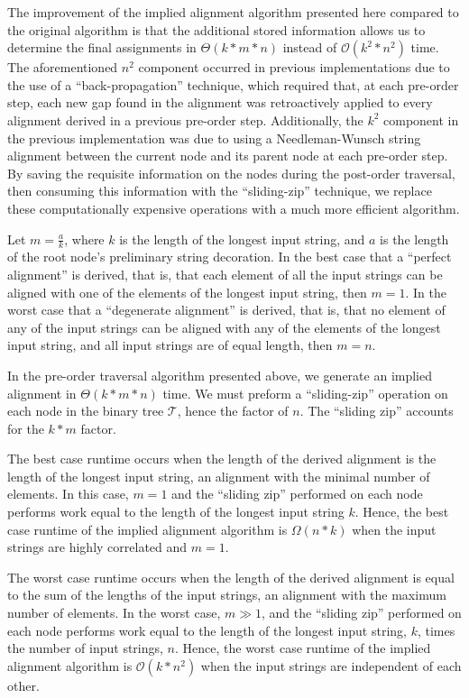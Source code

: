 \documentclass{bmcart}
\begin{document}
The improvement of the implied alignment algorithm presented here compared to the original algorithm is that the additional stored information allows us to determine the final assignments in $\Theta(k * m * n)$ instead of $\mathcal{O}(k^2 * n^2)$ time. 
The aforementioned $n^2$ component occurred in previous implementations due to the use of a ``back-propagation'' technique, which required that, at each pre-order step, each new gap found in the alignment was retroactively applied to every alignment derived in a previous pre-order step.
Additionally, the $k^2$ component in the previous implementation was due to using a Needleman-Wunsch string alignment between the current node and its parent node at each pre-order step.
By saving the requisite information on the nodes during the post-order traversal, then consuming this information with the ``sliding-zip'' technique, we replace these computationally expensive operations with a much more efficient algorithm.

Let $m = \frac{a}{k}$, where $k$ is the length of the longest input string, and $a$ is the length of the root node's preliminary string decoration.
In the best case that a ``perfect alignment'' is derived, that is, that each element of all the input strings can be aligned with one of the elements of the longest input string, then $m = 1$.
In the worst case that a ``degenerate alignment'' is derived, that is, that no element of any of the input strings can be aligned with any of the elements of the longest input string, and all input strings are of equal length, then $m = n$.

In the pre-order traversal algorithm presented above, we generate an implied alignment in $\Theta(k * m * n)$ time.
We must preform a ``sliding-zip'' operation on each node in the binary tree $\mathcal{T}$, hence the factor of $n$.
The ``sliding zip'' accounts for the $k * m$ factor.

The best case runtime occurs when the length of the derived alignment is the length of the longest input string, an alignment with the minimal number of elements.
In this case, $m = 1$ and the ``sliding zip'' performed on each node performs work equal to the length of the longest input string $k$.
Hence, the best case runtime of the implied alignment algorithm is $\Omega(n*k)$ when the input strings are highly correlated and $m = 1$.

The worst case runtime occurs when the length of the derived alignment is equal to the sum of the lengths of the input strings, an alignment with the maximum number of elements.
In the worst case, $m \gg 1$, and the ``sliding zip'' performed on each node performs work equal to the length of the longest input string, $k$, times the number of input strings, $n$.
Hence, the worst case runtime of the implied alignment algorithm is $\mathcal{O}(k * n^2)$ when the input strings are independent of each other.
\end{document}
